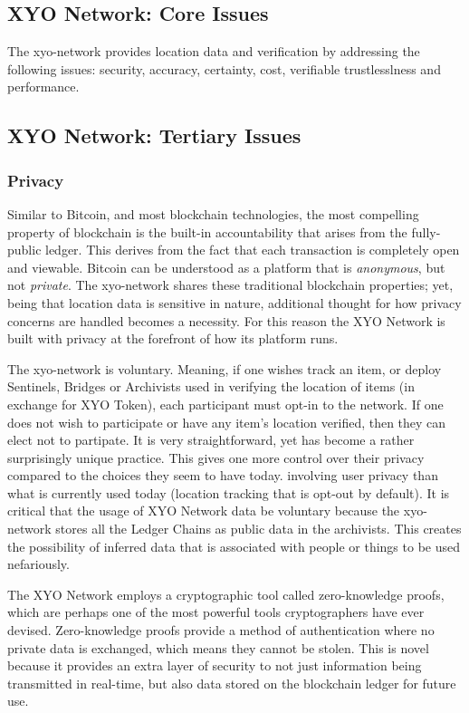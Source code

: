 \documentclass{article}
\begin{document}
\subsection {XYO Network: Core Issues}
The \Gls{xyo-network} provides location data and verification by addressing the following issues: security, accuracy, \gls{certainty}, cost, verifiable trustlesslness and performance.

\subsection {XYO Network: Tertiary Issues}
\subsubsection{Privacy}

Similar to Bitcoin, and most blockchain technologies, the most compelling property of blockchain is the built-in accountability that arises from the fully-public ledger. This derives from the fact that each transaction is completely open and viewable. Bitcoin can be understood as a platform that is \textit{anonymous}, but not \textit{private}. The \Gls{xyo-network} shares these traditional blockchain properties; yet, being that location data is sensitive in nature, additional thought for how privacy concerns are handled becomes a necessity. For this reason the XYO Network is built with privacy at the forefront of how its platform runs. 

The \Gls{xyo-network} is voluntary. Meaning, if one wishes track an item, or deploy Sentinels, Bridges or Archivists used in verifying the location of items (in exchange for XYO Token), each participant must opt-in to the network. If one does not wish to participate or have any item's location verified, then they can elect not to partipate. It is very straightforward, yet has become a rather surprisingly unique practice.  This gives one more control over their privacy compared to the choices they seem to have today. involving user privacy than what is currently used today (location tracking that is opt-out by default). It is critical that the usage of XYO Network data be voluntary because the \Gls{xyo-network} stores all the Ledger Chains as public data in the \Glspl{archivist}. This creates the possibility of inferred data that is associated with people or things to be used nefariously.

The XYO Network employs a cryptographic tool called zero-knowledge proofs, which are perhaps one of the most powerful tools cryptographers have ever devised. Zero-knowledge proofs provide a method of authentication where no private data is exchanged, which means they cannot be stolen. This is novel because it provides an extra layer of security to not just information being transmitted in real-time, but also data stored on the blockchain ledger for future use.
\end{document}
